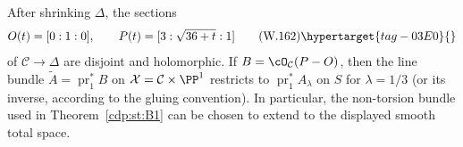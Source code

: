 
\begin{lemma}
\hypertarget{tag-03I9}{}\label{wbII:lem:extending-gluing}


After shrinking $\Delta$, the sections
\[
 O(t)=[0:1:0],\qquad
 P(t)=[3:\sqrt{36+t}:1]
\tag{W.162}\hypertarget{tag-03E0}{}\label{wbII:eq:CN:4.5a}
\]
of $\mathcal C\to\Delta$ are disjoint and holomorphic.  If
$B=\cO_{\mathcal C}(P-O)$, then the line bundle
$\widetilde A=\operatorname{pr}_1^*B$ on $\mathcal X=\mathcal C\times\PP^1$
restricts to $\operatorname{pr}_1^*A_{\lambda}$ on $S$ for
$\lambda=1/3$ (or its inverse, according to the gluing convention).  In
particular, the non-torsion bundle used in Theorem~\ref{cdp:st:B1} can
be chosen to extend to the displayed smooth total space.
\end{lemma}

